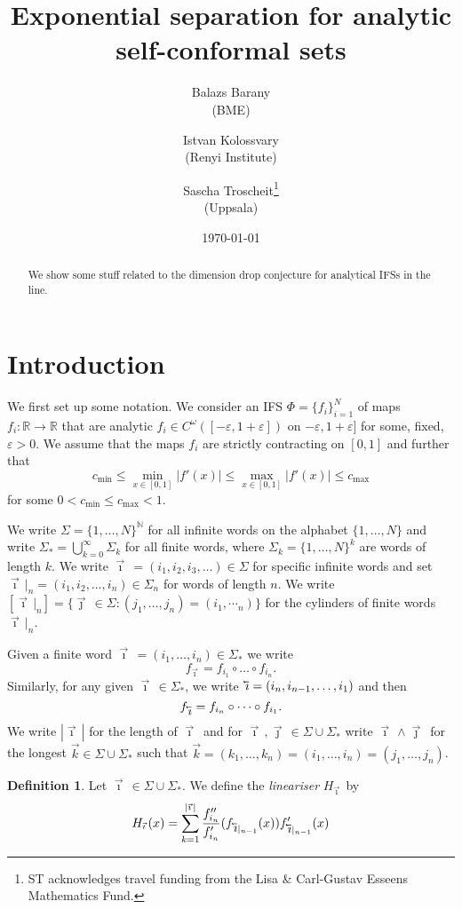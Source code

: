 \documentclass[12pt,]{article}
\title{Exponential separation for analytic self-conformal sets}
\author{Balazs Barany \\(BME) \and Istvan Kolossvary\\ (Renyi Institute) \and Sascha
Troscheit\footnote{ST acknowledges travel funding from the Lisa \& Carl-Gustav Esseens Mathematics
Fund.} \\(Uppsala)}
\date{\today}
\theoremstyle{definition}
\newtheorem{definition}[theorem]{Definition}
\theoremstyle{remark}
\renewcommand{\Bbb}[1]{\mathbb{#1}}
\newcommand{\bbN}{{\Bbb N}}         %
\newcommand{\bbR}{{\Bbb R}}        %
\newcommand{\0}{\mathbf{0}}
\newcommand{\eps}{\varepsilon}
\newcommand{\cev}[1]{\reflectbox{\ensuremath{\vec{\reflectbox{\ensuremath{#1}}}}}}
\newcommand{\bi}{\vec{\imath}\,}
\newcommand{\bj}{\vec{\jmath}\,}
\newcommand{\bk}{{\vec{k}}}
\newcommand{\bbi}{\,\cev{\imath}}
\begin{document}
\frenchspacing
\maketitle

\begin{abstract}
  We show some stuff related to the dimension drop conjecture for analytical IFSs in the line.
\end{abstract}



%
%


\section{Introduction} \label{sec:intro}
We first set up some notation. We consider an IFS $\Phi=\{f_i\}_{i=1}^N$ of maps $f_i:\bbR\to\bbR$
that are analytic $f_i \in C^\omega([-\eps,1+\eps])$ on $-\eps,1+\eps]$ for some, fixed, $\eps>0$.
We assume that the maps $f_i$ are strictly contracting on $[0,1]$ and further that 
\[
  c_{\min} \leq \min_{x\in[0,1]}
  |f'(x)| \leq \max_{x\in[0,1]}|f'(x)| \leq c_{\max} 
\]
for some $0<c_{\min} \leq c_{\max}<1$.

We write $\Sigma = \{1,\dots, N\}^{\bbN}$ for all infinite words on the alphabet $\{1,\dots,N\}$ and
write $\Sigma_* = \bigcup_{k=0}^\infty \Sigma_k$ for all finite words, where $\Sigma_k =
\{1,\dots,N\}^k$ are words of length $k$.
We write $\bi=(i_1,i_2,i_3,\dots) \in\Sigma$ for specific infinite words and set $\bi|_n =
(i_1,i_2,\dots,i_n)\in \Sigma_n$ for words of length $n$. We write $[\bi|_n] = \{\bj\in\Sigma :
(j_1,\dots,j_n) = (i_1,\dotsi_n)\}$ for the cylinders of finite words $\bi|_n$. 

Given a finite word $\bi=(i_1,\dots,i_n)\in\Sigma_*$ we write
\[
  f_{\bi} = f_{i_1}\circ \dots \circ f_{i_n}.
\]
Similarly, for any given $\bi\in\Sigma_*$, we write $\bbi = (i_n,i_{n-1},\dots, i_1)$ and then
\[
  f_{\bbi} = f_{i_n}\circ \dots \circ f_{i_1}.
\]
We write $|\bi|$ for the length of $\bi$ and for $\bi,\bj\in\Sigma\cup\Sigma_*$ write $\bi\wedge\bj$
for the longest $\bk\in\Sigma\cup\Sigma_*$ such that $\bk=(k_1,\dots, k_n) = (i_1,\dots,
i_n)=(j_1,\dots,j_n)$.

\begin{definition}
  Let $\bi\in \Sigma\cup\Sigma_*$. We define the \emph{lineariser} $H_{\bi}$ by
  \[
    H_{\bi}(x) = \sum_{k=1}^{|\bi|}
  \frac{f''_{i_n}}{f'_{i_n}}(f_{\bbi|_{n-1}}(x))f'_{\bbi|_{n-1}}(x)
  \]
\end{definition}
\end{document}
